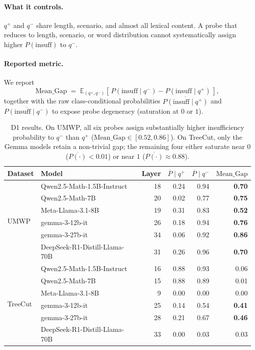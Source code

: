\paragraph{What it controls.}
$q^+$ and $q^-$ share length, scenario, and almost all lexical content.
A probe that reduces to length, scenario, or word distribution cannot
systematically assign higher $P(\text{insuff})$ to $q^-$.

\paragraph{Reported metric.}
We report
\[
\mathrm{Mean\_Gap} \;=\; \mathbb{E}_{(q^+,q^-)}\!\left[\,
   P(\text{insuff}\mid q^-) - P(\text{insuff}\mid q^+)\,\right],
\]
together with the raw class-conditional probabilities
$\overline{P(\text{insuff}\mid q^+)}$ and
$\overline{P(\text{insuff}\mid q^-)}$ to expose probe degeneracy
(saturation at $0$ or $1$).

\begin{table}[h]
\centering
\small
\caption{D1 results. On UMWP, all six probes assign substantially higher
insufficiency probability to $q^-$ than $q^+$
($\mathrm{Mean\_Gap} \in [0.52, 0.86]$). On TreeCut, only the Gemma
models retain a non-trivial gap; the remaining four either saturate
near $0$ ($\overline{P(\cdot)} < 0.01$) or near $1$
($\overline{P(\cdot)} \approx 0.88$).}
\label{tab:d1}
\begin{tabular}{llrrrr}
\toprule
Dataset & Model & Layer
        & $\overline{P}\!\mid\!q^+$
        & $\overline{P}\!\mid\!q^-$
        & $\mathrm{Mean\_Gap}$ \\
\midrule
\multirow{6}{*}{UMWP}
 & Qwen2.5-Math-1.5B-Instruct      & 18 & 0.24 & 0.94 & \textbf{0.70} \\
 & Qwen2.5-Math-7B                 & 20 & 0.02 & 0.77 & \textbf{0.75} \\
 & Meta-Llama-3.1-8B               & 19 & 0.31 & 0.83 & \textbf{0.52} \\
 & gemma-3-12b-it                  & 26 & 0.18 & 0.94 & \textbf{0.76} \\
 & gemma-3-27b-it                  & 34 & 0.06 & 0.92 & \textbf{0.86} \\
 & DeepSeek-R1-Distill-Llama-70B   & 31 & 0.26 & 0.96 & \textbf{0.70} \\
\midrule
\multirow{6}{*}{TreeCut}
 & Qwen2.5-Math-1.5B-Instruct      & 16 & 0.88 & 0.93 & 0.06 \\
 & Qwen2.5-Math-7B                 & 15 & 0.88 & 0.89 & 0.01 \\
 & Meta-Llama-3.1-8B               &  9 & 0.00 & 0.00 & 0.00 \\
 & gemma-3-12b-it                  & 25 & 0.14 & 0.54 & \textbf{0.41} \\
 & gemma-3-27b-it                  & 28 & 0.21 & 0.67 & \textbf{0.46} \\
 & DeepSeek-R1-Distill-Llama-70B   & 33 & 0.00 & 0.03 & 0.03 \\
\bottomrule
\end{tabular}
\end{table}

